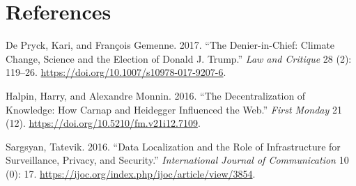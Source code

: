 \documentclass[conference,final,]{IEEEtran}
\begin{document}
\newpage

\hypertarget{references}{%
\section*{References}\label{references}}

\hypertarget{refs}{}
\leavevmode\hypertarget{ref-de_pryck_denier_2017}{}%
De Pryck, Kari, and François Gemenne. 2017. ``The Denier-in-Chief:
Climate Change, Science and the Election of Donald J. Trump.'' \emph{Law
and Critique} 28 (2): 119--26.
\url{https://doi.org/10.1007/s10978-017-9207-6}.

\leavevmode\hypertarget{ref-halpin_decentralization_2016}{}%
Halpin, Harry, and Alexandre Monnin. 2016. ``The Decentralization of
Knowledge: How Carnap and Heidegger Influenced the Web.'' \emph{First
Monday} 21 (12). \url{https://doi.org/10.5210/fm.v21i12.7109}.

\leavevmode\hypertarget{ref-sargsyan_data_2016}{}%
Sargsyan, Tatevik. 2016. ``Data Localization and the Role of
Infrastructure for Surveillance, Privacy, and Security.''
\emph{International Journal of Communication} 10 (0): 17.
\url{https://ijoc.org/index.php/ijoc/article/view/3854}.
\end{document}
